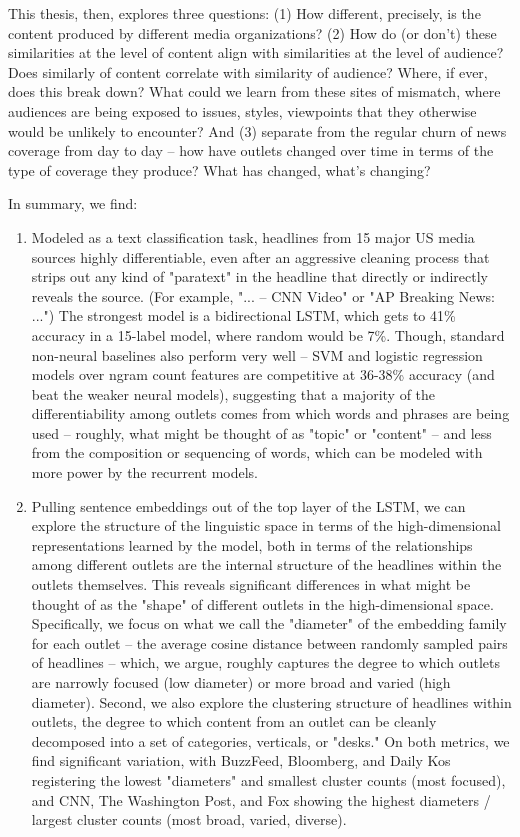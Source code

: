 \documentclass{scrartcl}
\begin{document}
This thesis, then, explores three questions: (1) How different, precisely, is the content produced by different media organizations? (2) How do (or don't) these similarities at the level of content align with similarities at the level of audience? Does similarly of content correlate with similarity of audience? Where, if ever, does this break down? What could we learn from these sites of mismatch, where audiences are being exposed to issues, styles, viewpoints that they otherwise would be unlikely to encounter? And (3) separate from the regular churn of news coverage from day to day -- how have outlets changed over time in terms of the type of coverage they produce? What has changed, what's changing?

In summary, we find:

\begin{enumerate}

\item Modeled as a text classification task, headlines from 15 major US media sources highly differentiable, even after an aggressive cleaning process that strips out any kind of "paratext" in the headline that directly or indirectly reveals the source. (For example, "... -- CNN Video" or "AP Breaking News: ...") The strongest model is a bidirectional LSTM, which gets to 41\% accuracy in a 15-label model, where random would be 7\%. Though, standard non-neural baselines also perform very well -- SVM and logistic regression models over ngram count features are competitive at 36-38\% accuracy (and beat the weaker neural models), suggesting that a majority of the differentiability among outlets comes from which words and phrases are being used -- roughly, what might be thought of as "topic" or "content" -- and less from the composition or sequencing of words, which can be modeled with more power by the recurrent models.

\item Pulling sentence embeddings out of the top layer of the LSTM, we can explore the structure of the linguistic space in terms of the high-dimensional representations learned by the model, both in terms of the relationships among different outlets are the internal structure of the headlines within the outlets themselves. This reveals significant differences in what might be thought of as the "shape" of different outlets in the high-dimensional space. Specifically, we focus on what we call the "diameter" of the embedding family for each outlet -- the average cosine distance between randomly sampled pairs of headlines -- which, we argue, roughly captures the degree to which outlets are narrowly focused (low diameter) or more broad and varied (high diameter). Second, we also explore the clustering structure of headlines within outlets, the degree to which content from an outlet can be cleanly decomposed into a set of categories, verticals, or "desks." On both metrics, we find significant variation, with BuzzFeed, Bloomberg, and Daily Kos registering the lowest "diameters" and smallest cluster counts (most focused), and CNN, The Washington Post, and Fox showing the highest diameters / largest cluster counts (most broad, varied, diverse).


\end{enumerate}
\end{document}
